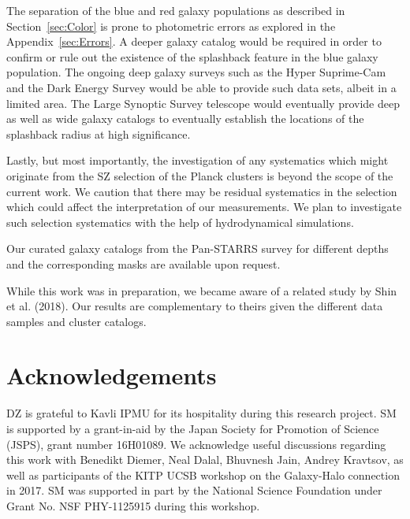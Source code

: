 \documentclass[iop, apjl, twocolappendix, numberedappendix]{emulateapj}
\begin{document}
The separation of the blue and red galaxy populations as described in
Section~\ref{sec:Color} is prone to photometric errors as explored in
the Appendix~\ref{sec:Errors}. A deeper galaxy catalog would be required in order to
confirm or rule out the existence of the splashback feature in the
blue galaxy population. The ongoing deep galaxy surveys such as the
Hyper Suprime-Cam \citep{Aihara2018} and the Dark Energy Survey \citep{Abbott2018} would be able
to provide such data sets, albeit in a limited area. The Large
Synoptic Survey telescope \citep{LSST2009} would eventually provide deep as well
as wide galaxy catalogs to eventually establish the locations of the
splashback radius at high significance.

Lastly, but most importantly, the investigation of any systematics
which might originate from the SZ selection of the Planck clusters
is beyond the scope of the current work. We caution that there may
be residual systematics in the selection which could affect the
interpretation of our measurements. We plan to investigate such
selection systematics with the help of hydrodynamical simulations.

Our curated galaxy catalogs from the Pan-STARRS survey for different
depths and the corresponding masks are available upon request.

While this work was in preparation, we became aware of a related study
by Shin et al. (2018). Our results are complementary to theirs given
the different data samples and cluster catalogs.

\section*{Acknowledgements}
DZ is grateful to Kavli IPMU for its hospitality during this research
project. SM is supported by a grant-in-aid by the Japan Society for
Promotion of Science (JSPS), grant number 16H01089. We acknowledge
useful discussions regarding this work with Benedikt Diemer, Neal
Dalal, Bhuvnesh Jain, Andrey Kravtsov, as well as participants of the
KITP UCSB workshop on the Galaxy-Halo connection in 2017. SM was
supported in part by the National Science Foundation under Grant No.
NSF PHY-1125915 during this workshop.
\end{document}
